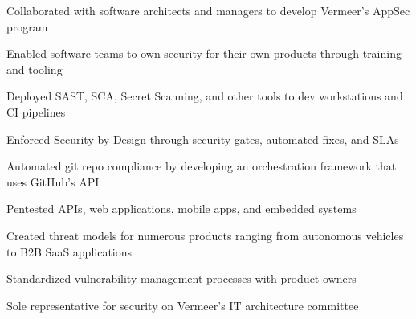 \item Collaborated with software architects and managers to develop Vermeer's AppSec program
\item Enabled software teams to own security for their own products through training and tooling
\item Deployed SAST, SCA, Secret Scanning, and other tools to dev workstations and CI pipelines
\item Enforced Security-by-Design through security gates, automated fixes, and SLAs
\item Automated git repo compliance by developing an orchestration framework that uses GitHub's API
\item Pentested APIs, web applications, mobile apps, and embedded systems
\item Created threat models for numerous products ranging from autonomous vehicles to B2B SaaS applications
\item Standardized vulnerability management processes with product owners
\item Sole representative for security on Vermeer's IT architecture committee